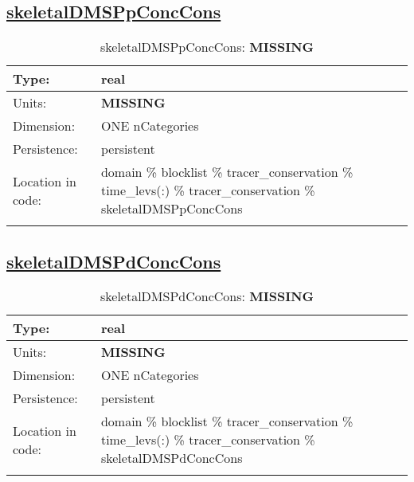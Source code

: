 \subsection[skeletalDMSPpConcCons]{\hyperref[sec:var_tab_tracer_conservation]{skeletalDMSPpConcCons}}
\label{subsec:var_sec_tracer_conservation_skeletalDMSPpConcCons}
\begin{center}
\begin{longtable}{| p{2.0in} | p{4.0in} |}
        \hline 
        Type: & real \\
        \hline 
        Units: & {\bf \color{red} MISSING} \\
        \hline 
        Dimension: & ONE nCategories \\
        \hline 
        Persistence: & persistent \\
        \hline 
         Location in code: & domain \% blocklist \% tracer\_conservation \% time\_levs(:) \% tracer\_conservation \% skeletalDMSPpConcCons \\
         \hline 
    \caption{skeletalDMSPpConcCons: {\bf \color{red} MISSING}}
\end{longtable}
\end{center}
\subsection[skeletalDMSPdConcCons]{\hyperref[sec:var_tab_tracer_conservation]{skeletalDMSPdConcCons}}
\label{subsec:var_sec_tracer_conservation_skeletalDMSPdConcCons}
\begin{center}
\begin{longtable}{| p{2.0in} | p{4.0in} |}
        \hline 
        Type: & real \\
        \hline 
        Units: & {\bf \color{red} MISSING} \\
        \hline 
        Dimension: & ONE nCategories \\
        \hline 
        Persistence: & persistent \\
        \hline 
         Location in code: & domain \% blocklist \% tracer\_conservation \% time\_levs(:) \% tracer\_conservation \% skeletalDMSPdConcCons \\
         \hline 
    \caption{skeletalDMSPdConcCons: {\bf \color{red} MISSING}}
\end{longtable}
\end{center}
